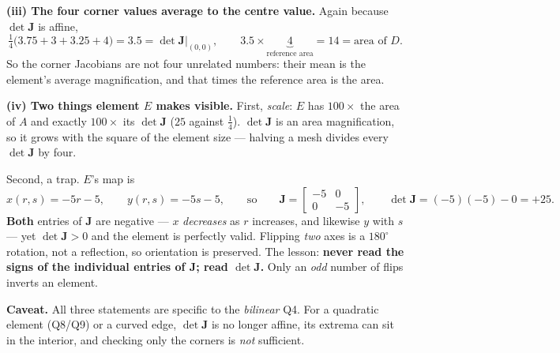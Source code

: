 \documentclass[11pt]{article}
\begin{document}
{{\medskip
\textbf{(iii) The four corner values average to the centre value.} Again
because $\det\bm{J}$ is affine,
\[
  \tfrac14\bigl(3.75+3+3.25+4\bigr)=3.5=\det\bm{J}\bigl|_{(0,0)},
  \qquad
  3.5\times\underbrace{4}_{\text{reference area}}=14=\text{area of }D .
\]
So the corner Jacobians are not four unrelated numbers: their mean is the
element's average magnification, and that times the reference area is the area.

\medskip
\textbf{(iv) Two things element $E$ makes visible.} First, \emph{scale}:
$E$ has $100\times$ the area of $A$ and exactly $100\times$ its
$\det\bm{J}$ ($25$ against $\tfrac14$). $\det\bm{J}$ is an area magnification,
so it grows with the square of the element size --- halving a mesh divides
every $\det\bm{J}$ by four.

\medskip
Second, a trap. $E$'s map is
\[
  x(r,s)=-5r-5,\qquad y(r,s)=-5s-5,
  \qquad\text{so}\qquad
  \bm{J}=\begin{bmatrix}-5&0\\0&-5\end{bmatrix},
  \qquad \det\bm{J}=(-5)(-5)-0=+25 .
\]
\textbf{Both} entries of $\bm{J}$ are negative --- $x$ \emph{decreases} as $r$
increases, and likewise $y$ with $s$ --- yet $\det\bm{J}>0$ and the element is
perfectly valid. Flipping \emph{two} axes is a $180^{\circ}$ rotation, not a
reflection, so orientation is preserved. The lesson: \textbf{never read the
signs of the individual entries of $\bm{J}$; read $\det\bm{J}$.} Only an
\emph{odd} number of flips inverts an element.

\medskip
\textbf{Caveat.} All three statements are specific to the \emph{bilinear} Q4.
For a quadratic element (Q8/Q9) or a curved edge, $\det\bm{J}$ is no longer
affine, its extrema can sit in the interior, and checking only the corners is
\emph{not} sufficient.}}
\end{document}

